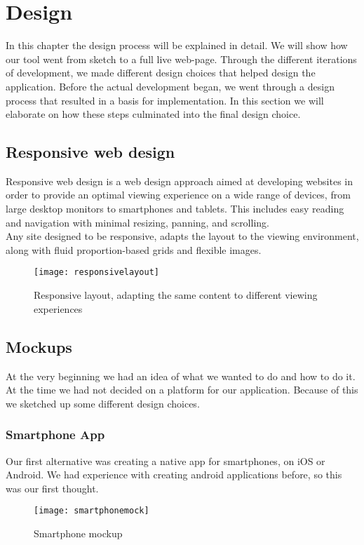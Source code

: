 \chapter{Design}
In this chapter the design process will be explained in detail. We will show how our tool went from sketch to a full live web-page. 
Through the different iterations of development, we made different design choices that helped design the application. Before the actual development began, we went
through a design process that resulted in a basis for implementation. In this section we will elaborate on how these steps culminated into the final design choice.
\section{Responsive web design}
Responsive web design\cite{responsivearticle} is a web design approach aimed at developing websites in order to provide an optimal viewing experience on a wide range of devices, from large desktop monitors to smartphones and tablets. This includes easy reading and navigation with minimal resizing, panning, and scrolling.\\
Any site designed to be responsive, adapts the layout to the viewing environment, along with fluid proportion-based grids and flexible images.\\
\begin{figure}[h!]
\label{responsivelayout}
\centering
	\texttt{[image: responsivelayout]}
\caption{Responsive layout, adapting the same content to different viewing experiences}
\end{figure}

\section{Mockups}
At the very beginning we had an idea of what we wanted to do and how to do it. At the time we had not decided on a platform for our application. Because of this we sketched up some different design choices.

\subsection{Smartphone App}
Our first alternative was creating a native app for smartphones, on iOS or Android. We had experience with creating android applications before, so this was our first thought. 
\begin{figure}[h!]
\label{smartphonemock}
\centering
	\texttt{[image: smartphonemock]}
\caption{Smartphone mockup}
\end{figure}


